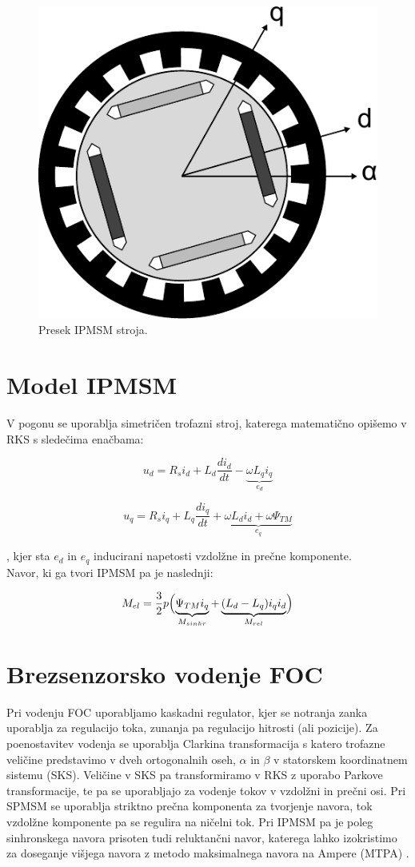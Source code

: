 \documentclass[a4paper,twoside,openright,12pt,slovene]{book}
\begin{document}
\begin{figure}[!htbp]
    \centering
    \includegraphics[width=0.5\columnwidth]{Slike/Inkscape/IPMSM.pdf}
    \caption{\label{IPMSM} Presek IPMSM stroja.}
\end{figure}


\section{Model IPMSM} \label{motor}

V pogonu se uporablja simetričen trofazni stroj, katerega matematično opišemo v RKS s sledečima enačbama:

\begin{equation} \label{motorModelD}
    u_d = R_si_d+L_d\frac{di_d}{dt}-\underbrace{\omega L_qi_q}_{e_d}
\end{equation}

\begin{equation} \label{motorModelQ}
    u_q = R_si_q+L_q\frac{di_q}{dt}+\underbrace{\omega L_di_d + \omega\Psi_{TM}}_{e_q}
\end{equation}

, kjer sta $e_d$ in $e_q$ inducirani napetosti vzdolžne in prečne komponente.
\\
Navor, ki ga tvori IPMSM pa je naslednji:

\begin{equation}
    M_{el} = \frac{3}{2}p\Bigl(\underbrace{\Psi_{TM}i_q}_{M_{sinhr}}+\underbrace{(L_d-L_q)i_qi_d}_{M_{rel}}\Bigr)
\end{equation}



\section{Brezsenzorsko vodenje FOC}

Pri vodenju FOC uporabljamo kaskadni regulator, kjer se notranja zanka uporablja za regulacijo toka, zunanja pa regulacijo hitrosti (ali pozicije). Za poenostavitev vodenja se uporablja Clarkina
transformacija s katero trofazne veličine predstavimo v dveh ortogonalnih oseh, $\alpha$ in $\beta$ v statorskem koordinatnem sistemu (SKS). Veličine v SKS pa transformiramo v RKS z uporabo Parkove
transformacije, te pa se uporabljajo za vodenje tokov v vzdolžni in prečni osi. Pri SPMSM se uporablja striktno prečna komponenta za tvorjenje navora, tok vzdolžne komponente pa se regulira na ničelni
tok. Pri IPMSM pa je poleg sinhronskega navora prisoten tudi reluktančni navor, katerega lahko izokristimo za doseganje višjega navora z metodo maksimalnega navora na Ampere (MTPA)
\cite{ambrovzivc2016elektrivcni}.
\end{document}
